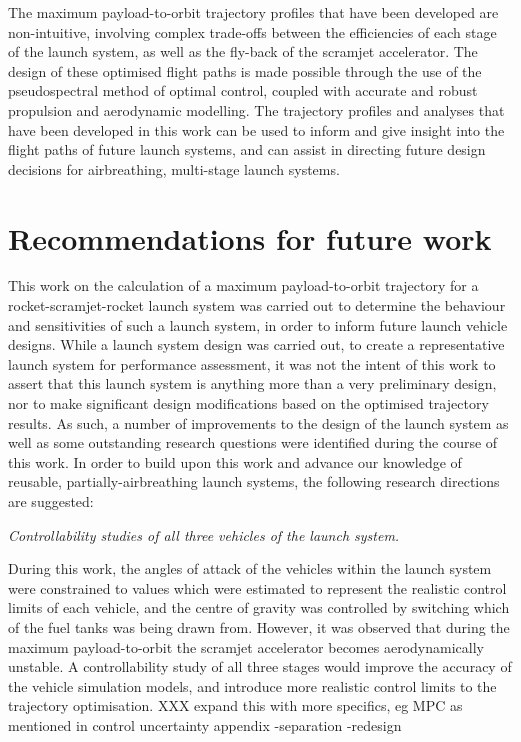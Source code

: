 The maximum payload-to-orbit trajectory profiles that have been developed are non-intuitive, involving complex trade-offs between the efficiencies of each stage of the launch system, as well as the fly-back of the scramjet accelerator. The design of these optimised flight paths is made possible through the use of the pseudospectral method of optimal control, coupled with accurate and robust propulsion and aerodynamic modelling.  
The trajectory profiles and analyses that have been developed in this work can be used to inform and give insight into the flight paths of future launch systems, and can assist in directing future design decisions for airbreathing, multi-stage launch systems. 


  \chapter{Recommendations for future work}
  	
 This work on the calculation of a maximum payload-to-orbit trajectory for a rocket-scramjet-rocket launch system was carried out to determine the behaviour and sensitivities of such a launch system, in order to inform future launch vehicle designs. 
  While a launch system design was carried out, to create a representative launch system for performance assessment, it was not the intent of this work to assert that this launch system is anything more than a very preliminary design, nor to make significant design modifications based on the optimised trajectory results.
 As such, a number of improvements to the design of the launch system as well as some outstanding research questions were identified during the course of this work.
 In order to build upon this work and advance our knowledge of reusable, partially-airbreathing launch systems, the following research directions are suggested:

\vspace{10pt}
\textit{Controllability studies of all three vehicles of the launch system.}

 \noindent
During this work, the angles of attack of the vehicles within the launch system were constrained to values which were estimated to represent the realistic control limits of each vehicle, and the centre of gravity was controlled by switching which of the fuel tanks was being drawn from. However, it was observed that during the maximum payload-to-orbit the scramjet accelerator becomes aerodynamically unstable.
A controllability study of all three stages would improve the accuracy of the vehicle simulation models, and introduce more realistic control limits to the trajectory optimisation.  XXX expand this with more specifics, eg MPC as mentioned in control uncertainty appendix
-separation
-redesign

